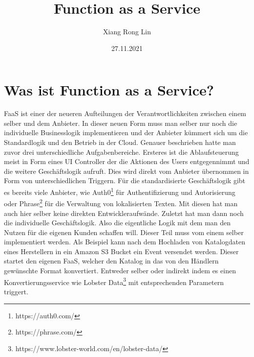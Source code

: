 \documentclass[12pt, a4paper]{article}
\title{Function as a Service}
\author{Xiang Rong Lin}
\date{27.11.2021}
\begin{document}
\maketitle



\newpage
\tableofcontents

\newpage

\section{Was ist Function as a Service?}
\ac{FaaS} ist einer der neueren Aufteilungen der Verantwortlichkeiten zwischen einem selber und dem Anbieter.
In dieser neuen Form muss man selber nur noch die individuelle Businesslogik implementieren und der Anbieter kümmert sich um die Standardlogik und den Betrieb in der Cloud.
Genauer beschrieben hatte man zuvor drei unterschiedliche Aufgabenbereiche\cite{serverless2017roewekamp}.
\newline
Ersteres ist die Ablaufsteuerung meist in Form eines UI Controller der die Aktionen des Users entgegennimmt und die weitere Geschäftslogik aufruft.
Dies wird direkt vom Anbieter übernommen in Form von unterschiedlichen Triggern.
\newline
Für die standardisierte Geschäftslogik gibt es bereits viele Anbieter, wie Auth0\footnote{https://auth0.com/} für Authentifizierung und Autorisierung oder Phrase\footnote{https://phrase.com/} für die Verwaltung von lokalisierten Texten.
Mit diesen hat man auch hier selber keine direkten Entwickleraufwände.
\newline
Zuletzt hat man dann noch die individuelle Geschäftslogik.
Also die eigentliche Logik mit dem man den Nutzen für die eigenen Kunden schaffen will.
Dieser Teil muss vom einem selber implementiert werden.
Als Beispiel kann nach dem Hochladen von Katalogdaten eines Herstellern in ein Amazon S3 Bucket ein Event versendet werden.
Dieser startet den eigenen \ac{FaaS}, welcher den Katalog in das von den Händlern gewünschte Format konvertiert.
Entweder selber oder indirekt indem es einen Konvertierungsservice wie Lobster Data\footnote{https://www.lobster-world.com/en/lobster-data/} mit entsprechenden Parametern triggert.
\end{document}
